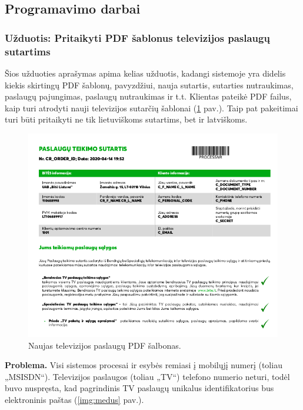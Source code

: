 \subsection{Programavimo darbai}

\subsubsection{Užduotis: Pritaikyti PDF šablonus televizijos paslaugų sutartims}
Šios užduoties aprašymas apima kelias užduotis, kadangi sistemoje yra didelis kiekis skirtingų PDF šablonų,
pavyzdžiui, nauja sutartis, sutarties nutraukimas, paslaugų pajungimas, paslaugų nutraukimas ir t.t.
Klientas pateikė PDF failus, kaip turi atrodyti nauji televizijos sutarčių šablonai (\ref{img:contract} pav.).
Taip pat pakeitimai turi būti pritaikyti ne tik lietuviškoms sutartims, bet ir latviškoms.

\begin{figure}[H]
    \centering
    \includegraphics[scale=0.5]{img/contract.png}
    \caption{Naujas televizijos paslaugų PDF šalbonas.}
    \label{img:contract}
\end{figure}

\textbf{Problema.} Visi sistemos procesai ir esybės remiasi į mobilųjį numerį (toliau „MSISDN“). Televizijos paslaugos (toliau „TV“) telefono numerio neturi, todėl buvo nuspręsta,
kad pagrindinis TV paslaugų unikalus identifikatorius bus elektroninis paštas (\ref{img:medus} pav.).

